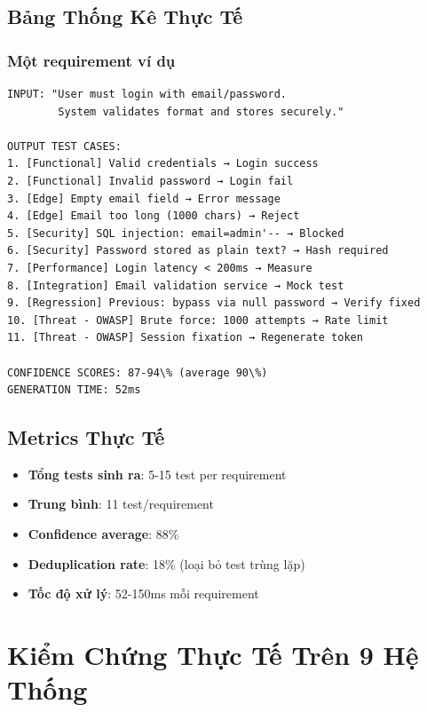 \documentclass[12pt,a4paper]{report}
\begin{document}
\section{Bảng Thống Kê Thực Tế}

\subsection{Một requirement ví dụ}
\begin{verbatim}
INPUT: "User must login with email/password. 
        System validates format and stores securely."

OUTPUT TEST CASES:
1. [Functional] Valid credentials → Login success
2. [Functional] Invalid password → Login fail
3. [Edge] Empty email field → Error message
4. [Edge] Email too long (1000 chars) → Reject
5. [Security] SQL injection: email=admin'-- → Blocked
6. [Security] Password stored as plain text? → Hash required
7. [Performance] Login latency < 200ms → Measure
8. [Integration] Email validation service → Mock test
9. [Regression] Previous: bypass via null password → Verify fixed
10. [Threat - OWASP] Brute force: 1000 attempts → Rate limit
11. [Threat - OWASP] Session fixation → Regenerate token

CONFIDENCE SCORES: 87-94\% (average 90\%)
GENERATION TIME: 52ms
\end{verbatim}

\section{Metrics Thực Tế}

\begin{itemize}
    \item \textbf{Tổng tests sinh ra}: 5-15 test per requirement
    \item \textbf{Trung bình}: 11 test/requirement
    \item \textbf{Confidence average}: 88\%
    \item \textbf{Deduplication rate}: 18\% (loại bỏ test trùng lặp)
    \item \textbf{Tốc độ xử lý}: 52-150ms mỗi requirement
\end{itemize}

\chapter{Kiểm Chứng Thực Tế Trên 9 Hệ Thống}
\end{document}
